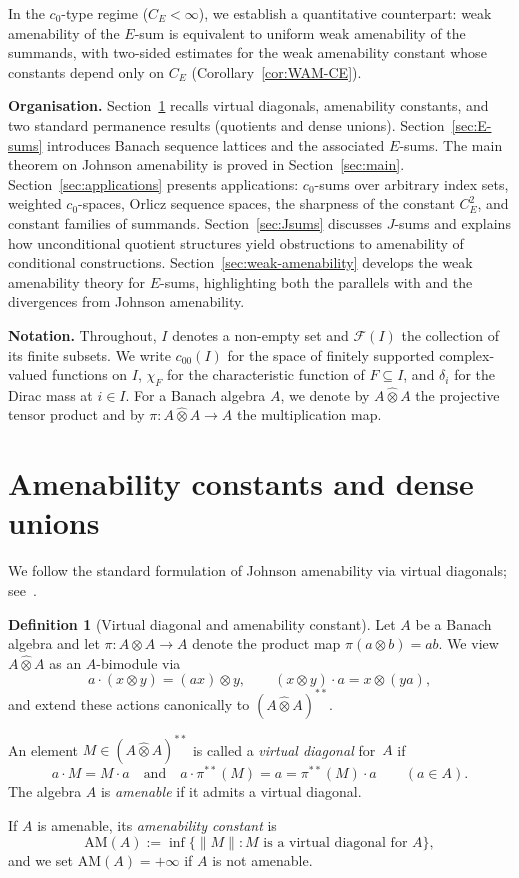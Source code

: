 \documentclass[reqno]{amsart}
\theoremstyle{plain}
\theoremstyle{definition}
\newtheorem{definition}[theorem]{Definition}
\theoremstyle{remark}
\newcommand{\AM}{\mathrm{AM}}
\newcommand{\hatot}{\widehat{\otimes}}
\begin{document}
In the $c_0$-type regime ($C_E < \infty$), we establish a quantitative counterpart:
weak amenability of the $E$-sum is equivalent to uniform weak amenability of the summands,
with two-sided estimates for the weak amenability constant whose constants depend only on $C_E$
(Corollary~\ref{cor:WAM-CE}).

\medskip
\noindent\textbf{Organisation.}
Section~\ref{sec:amenability-constants} recalls virtual diagonals, amenability constants,
and two standard permanence results (quotients and dense unions).
Section~\ref{sec:E-sums} introduces Banach sequence lattices and the associated $E$-sums.
The main theorem on Johnson amenability is proved in Section~\ref{sec:main}.
Section~\ref{sec:applications} presents applications: $c_0$-sums over arbitrary index sets,
weighted $c_0$-spaces, Orlicz sequence spaces, the sharpness of the constant $C_E^2$,
and constant families of summands.
Section~\ref{sec:Jsums} discusses $J$-sums and explains how unconditional quotient
structures yield obstructions to amenability of conditional constructions.
Section~\ref{sec:weak-amenability} develops the weak amenability theory for $E$-sums,
highlighting both the parallels with and the divergences from Johnson amenability.

\medskip
\noindent\textbf{Notation.}
Throughout, $I$ denotes a non-empty set and $\mathcal{F}(I)$ the collection of its finite subsets.
We write $c_{00}(I)$ for the space of finitely supported complex-valued functions on $I$,
$\chi_F$ for the characteristic function of $F \subseteq I$,
and $\delta_i$ for the Dirac mass at $i \in I$.
For a Banach algebra $A$, we denote by $A \hatot A$ the projective tensor product
and by $\pi\colon A \hatot A \to A$ the multiplication map.

\section{Amenability constants and dense unions}\label{sec:amenability-constants}

We follow the standard formulation of Johnson amenability via virtual diagonals; see~\cite{Johnson1972Cohomology,Runde2002Lectures}.

\begin{definition}[Virtual diagonal and amenability constant]\label{def:AM}
Let $A$ be a Banach algebra and let $\pi\colon A\hatot A\to A$ denote the product map $\pi(a\otimes b)=ab$.
We view $A\hatot A$ as an $A$-bimodule via
\[
a\cdot(x\otimes y)=(ax)\otimes y, \qquad (x\otimes y)\cdot a=x\otimes(ya),
\]
and extend these actions canonically to $(A\hatot A)^{**}$.

An element $M\in (A\hatot A)^{**}$ is called a \emph{virtual diagonal} for~$A$ if
\[
a\cdot M = M\cdot a \quad\text{and}\quad a\cdot \pi^{**}(M)=a=\pi^{**}(M)\cdot a
\qquad (a\in A).
\]
The algebra $A$ is \emph{amenable} if it admits a virtual diagonal.

If $A$ is amenable, its \emph{amenability constant} is
\[
\AM(A):=\inf\bigl\{\|M\|\colon M \text{ is a virtual diagonal for }A \bigr\},
\]
and we set $\AM(A)=+\infty$ if $A$ is not amenable.
\end{definition}
\end{document}
